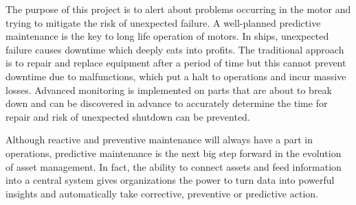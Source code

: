 The purpose of this project is to alert about problems occurring in the motor and trying to mitigate the risk of unexpected failure. A well-planned predictive maintenance is the key to long life operation of motors. In ships, unexpected failure causes downtime which deeply eats into profits. The traditional approach is to repair and replace equipment after a period of time but this cannot prevent downtime due to malfunctions, which put a halt to operations and incur massive losses. Advanced monitoring is implemented on parts that are about to break down and can be discovered in advance to accurately determine the time for repair and risk of unexpected shutdown can be prevented. \cite{sampaio_prediction_2019}

Although reactive and preventive maintenance will always have a part in operations, predictive maintenance is the next big step forward in the evolution of asset management. In fact, the ability to connect assets and feed information into a central system gives organizations the power to turn data into powerful insights and automatically take corrective, preventive or predictive action.
